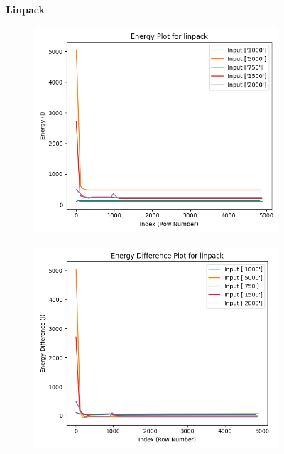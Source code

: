 \documentclass[times, 10pt,twocolumn]{article}
\begin{document}
\begin{figure}[ht]
   \textbf{Linpack}\par\medskip
   \begin{subfigure}[b]{0.22\textwidth}
      \includegraphics[width=\textwidth]{imgs/final_experiment_plots/model_analysis/measurement_data_analysis/linpack_energy.png}
     \caption{}
     \label{fig:linpack_energy}
   \end{subfigure}
   \hfill
   \begin{subfigure}[b]{0.22\textwidth}
      \includegraphics[width=\textwidth]{imgs/final_experiment_plots/model_analysis/measurement_data_analysis/linpack_energy_diff.png}

\end{subfigure}
\end{figure}
\end{document}
